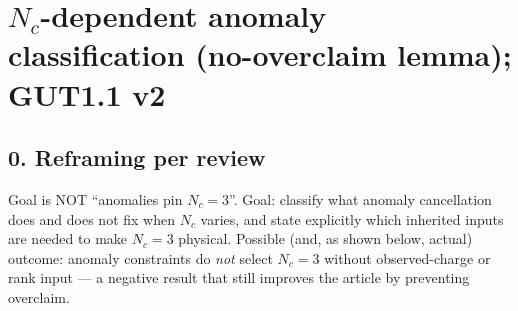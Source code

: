 \section*{$N_c$-dependent anomaly classification (no-overclaim
lemma); GUT1.1 v2}

\subsection*{0. Reframing per review}
Goal is NOT ``anomalies pin $N_c=3$''.
Goal: classify what anomaly cancellation does and does not fix
when $N_c$ varies, and state explicitly which inherited inputs are
needed to make $N_c=3$ physical.
Possible (and, as shown below, actual) outcome: anomaly
constraints do \emph{not} select $N_c=3$ without observed-charge
or rank input --- a negative result that still improves the
article by preventing overclaim.

